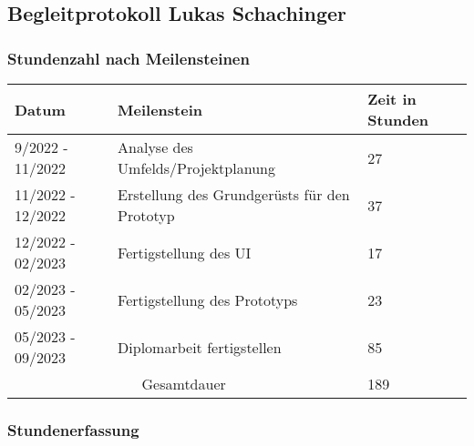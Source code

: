 \pagebreak

\subsection{Begleitprotokoll Lukas Schachinger}

\subsubsection{Stundenzahl nach Meilensteinen}

\begin{tabular}{|m{}|m{}|m{}|}
    \hline
    \cellcolor{gray!10} Datum & \cellcolor{gray!10} Meilenstein & \cellcolor{gray!10} Zeit in Stunden \\
    \hline
    9/2022 - 11/2022 & Analyse des Umfelds/Projektplanung & 27 \\
    \hline
    11/2022 - 12/2022 & Erstellung des Grundgerüsts für den Prototyp & 37 \\
    \hline
    12/2022 - 02/2023 & Fertigstellung des UI & 17 \\
    \hline
    02/2023 - 05/2023 & Fertigstellung des Prototyps & 23 \\
    \hline
    05/2023 - 09/2023 & Diplomarbeit fertigstellen & 85 \\ 
    \hline
    \multicolumn{2}{|c|}{\cellcolor{gray!30}Gesamtdauer} & 189 \\
    \hline
\end{tabular}

\noindent

\vspace{40pt}

\subsubsection{Stundenerfassung}

